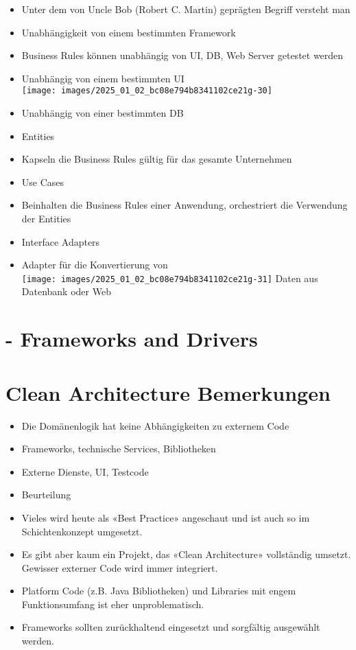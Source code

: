 \documentclass[10pt]{article}
\begin{document}
\begin{itemize}
  \item Unter dem von Uncle Bob (Robert C. Martin) geprägten Begriff versteht man
  \item Unabhängigkeit von einem bestimmten Framework
  \item Business Rules können unabhängig von UI, DB, Web Server getestet werden
  \item Unabhängig von einem bestimmten UI\\
\texttt{[image: images/2025\_01\_02\_bc08e794b8341102ce21g-30]}
  \item Unabhängig von einer bestimmten DB
  \item Entities
  \item Kapseln die Business Rules gültig für das gesamte Unternehmen
  \item Use Cases
  \item Beinhalten die Business Rules einer Anwendung, orchestriert die Verwendung der Entities
  \item Interface Adapters
  \item Adapter für die Konvertierung von\\
\texttt{[image: images/2025\_01\_02\_bc08e794b8341102ce21g-31]} Daten aus Datenbank oder Web
\end{itemize}

\section*{- Frameworks and Drivers}
\section*{Clean Architecture Bemerkungen}
\begin{itemize}
  \item Die Domänenlogik hat keine Abhängigkeiten zu externem Code
  \item Frameworks, technische Services, Bibliotheken
  \item Externe Dienste, UI, Testcode
  \item Beurteilung
  \item Vieles wird heute als «Best Practice» angeschaut und ist auch so im Schichtenkonzept umgesetzt.
  \item Es gibt aber kaum ein Projekt, das «Clean Architecture» vollständig umsetzt. Gewisser externer Code wird immer integriert.
  \item Platform Code (z.B. Java Bibliotheken) und Libraries mit engem Funktionsumfang ist eher unproblematisch.
  \item Frameworks sollten zurückhaltend eingesetzt und sorgfältig ausgewählt werden.
\end{itemize}
\end{document}

